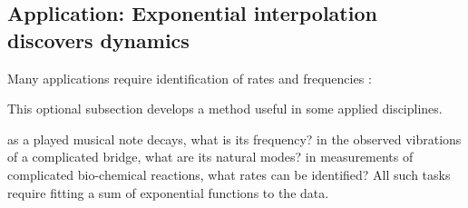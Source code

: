 









\subsection{Application: Exponential interpolation discovers dynamics}
\label{sec:eidd}


Many applications require identification of rates and frequencies \cite[e.g.]{Pereyra2010}:
\begin{aside}
This optional subsection develops a method useful in some applied disciplines.
\end{aside}%
as a played musical note decays, what is its frequency?
in the observed vibrations of a complicated bridge, what are its natural modes?
in measurements of complicated bio-chemical reactions, what rates can be identified?
All such tasks require fitting a sum of exponential functions to the data.


